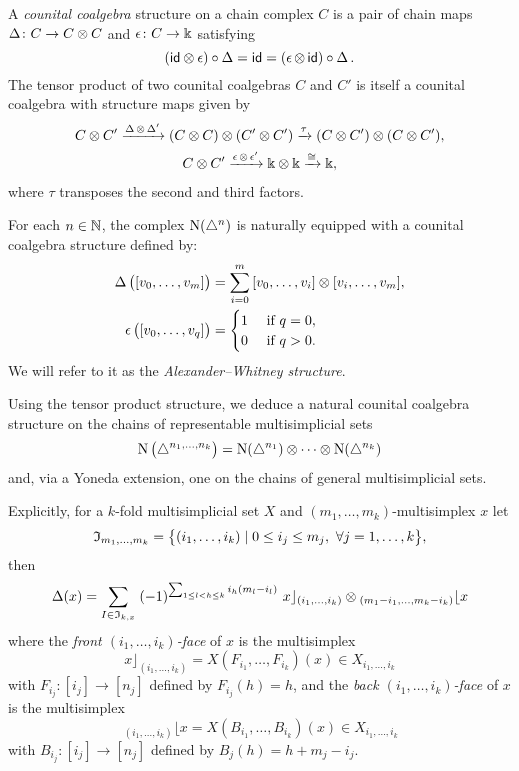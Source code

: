 A \textit{counital coalgebra} structure on a chain complex $C$ is a pair of chain maps $\copr \colon C \to C \ot C$ and $\aug \colon C \to \k$ satisfying
\[
(\id \ot \aug) \circ \copr =
\id =
(\aug \ot\, \id) \circ \copr.
\]
The tensor product of two counital coalgebras $C$ and $C'$ is itself a counital coalgebra with structure maps given by
\begin{gather*}
	C \ot C^\prime \xra{\copr \ot \copr^\prime}
	(C \ot C) \ot (C^\prime \ot C^\prime) \xra{\tau}
	(C \ot C^\prime) \ot (C \ot C^\prime), \\
	C \ot C^\prime \xra{\aug \ot \aug^\prime}
	\k \ot \k \xra{\cong} \k,
\end{gather*}
where $\tau$ transposes the second and third factors.




For each $n \in \N$, the complex $\chains(\simplex^n)$ is naturally equipped with a counital coalgebra structure defined by:
\[
\begin{split}
	\copr \big( [v_0, \dots, v_m] \big) &=
	\sum_{i=0}^m \, [v_0, \dots, v_i] \ot [v_i, \dots, v_m], \\
	\aug \big( [v_0, \dots, v_q] \big) &=
	\begin{cases} 1 & \text{ if } q = 0, \\ 0 & \text{ if } q>0. \end{cases}
\end{split}
\]
We will refer to it as the \textit{Alexander--Whitney structure}.

Using the tensor product structure, we deduce a natural counital coalgebra structure on the chains of representable multisimplicial sets
\[
\chains \big( \simplex^{n_1, \dots, n_k} \big) =
\chains(\simplex^{n_1}) \ot \dotsb \ot \chains(\simplex^{n_k})
\]
and, via a Yoneda extension, one on the chains of general multisimplicial sets.

Explicitly, for a $k$-fold multisimplicial set $X$ and $(m_1,\dots,m_k)$-multisimplex $x$ let
\[
\fI_{m_1,\dots,m_k} = \set[\big]{(i_{1},\dots,i_{k}) \mid 0 \le i_j \le m_j,\ \forall j = 1,\dots,k},
\]
then
\[
\copr(x) =
\sum_{I\in \mathfrak{I}_{k,x}} \;
(-1)^{\sum_{1 \leq l<h \leq k} i_h (m_l-i_l) } \
x \rfloor_{(i_{1},\dots,i_{k})} \ot
\!\,_{(m_{1}-i_{1}, \dots, m_{k}-i_{k})} \lfloor x
\]
where the \textit{front $(i_1,\dots,i_k)$-face} of $x$ is the multisimplex
\[
x \rfloor_{(i_{1}, \dots, i_{k})} =
X(F_{i_1}, \dots, F_{i_k})(x) \in X_{i_1,\dots,i_k}
\]
with
$F_{i_j} \colon [i_j] \to [n_j]$ defined by $F_{i_j}(h)=h$, and the \textit{back $(i_1,\dots,i_k)$-face} of $x$ is the multisimplex
\[
\,_{(i_{1}, \dots, i_{k})} \lfloor x =
X(B_{i_1}, \dots, B_{i_k})(x) \in X_{i_1,\dots,i_k}
\]
with $B_{i_j} \colon [i_j] \to [n_j]$ defined by $B_j(h) = h+m_j-i_j$.

